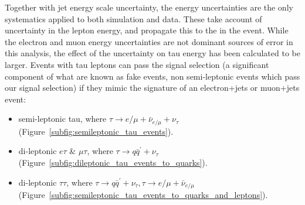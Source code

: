 Together with jet energy scale uncertainty, the \met energy uncertainties are the only systematics applied to
both simulation and data. These take account of uncertainty in the lepton energy, and propagate this to the
\met in the event. While the electron and muon energy uncertainties are not dominant sources of error in this
analysis, the effect of the uncertainty on tau energy has been calculated to be larger. Events with tau
leptons can pass the signal selection (a significant component of what are known as fake events, \ie non
semi-leptonic \ttbar events which pass our signal selection) if they mimic the signature of an electron+jets
or muon+jets \ttbar event:

\begin{itemize}
 \item semi-leptonic tau, where $\tau \rightarrow e/\mu + \bar{\nu}_{e/\mu} + \nu_{\tau}$
 (Figure~\ref{subfig:semileptonic_tau_events}).
 \item di-leptonic $e\tau$ \& $\mu\tau$, where $\tau \rightarrow q\bar{q}^{'} + \nu_\tau$
 (Figure~\ref{subfig:dileptonic_tau_events_to_quarks}).
 \item di-leptonic $\tau\tau$, where $\tau \rightarrow q\bar{q}^{'} + \nu_\tau, \tau \rightarrow e/\mu
 + \bar{\nu}_{e/\mu}$ (Figure~\ref{subfig:semileptonic_tau_events_to_quarks_and_leptons}).
\end{itemize}

